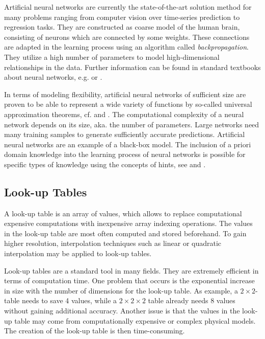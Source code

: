 Artificial neural networks are currently the state-of-the-art solution method for many problems ranging from computer vision over time-series prediction to regression tasks. They are constructed as coarse model of the human brain, consisting of neurons which are connected by some weights. These connections are adapted in the learning process using an algorithm called \emph{backpropagation}. They utilize a high number of parameters to model high-dimensional relationships in the data. Further information can be found in standard textbooks about neural networks, e.g. \cite{bishop2006patternRecognition} or \cite{goodfellow2016deep}. 

In terms of modeling flexibility, artificial neural networks of sufficient size are proven to be able to represent a wide variety of functions by so-called universal approximation theorems, cf. \cite{cybenko1989approximation} and \cite{hornik1991approximation}. The computational complexity of a neural network depends on its size, aka. the number of parameters. Large networks need many training samples to generate sufficiently accurate predictions. Artificial neural networks are an example of a black-box model. The inclusion of a priori domain knowledge into the learning process of neural networks is possible for specific types of knowledge using the concepts of hints, see \cite{abu1990learning} and \cite{sill1997monotonicity}.

\subsection{Look-up Tables}

A look-up table is an array of values, which allows to replace computational expensive computations with inexpensive array indexing operations. The values in the look-up table are most often computed and stored beforehand. To gain higher resolution, interpolation techniques such as linear or quadratic interpolation may be applied to look-up tables. 

Look-up tables are a standard tool in many fields. They are extremely efficient in terms of computation time. One problem that occurs is the exponential increase in size with the number of dimensions for the look-up table. As example, a $2 \times 2$-table needs to save 4 values, while a $2 \times 2 \times 2$ table already needs 8 values without gaining additional accuracy. Another issue is that the values in the look-up table may come from computationally expensive or complex physical models. The creation of the look-up table is then time-consuming.  

